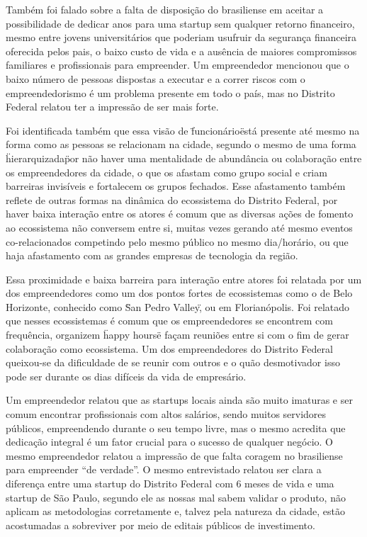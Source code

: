 Também foi falado sobre a falta de disposição do brasiliense em aceitar a possibilidade de dedicar anos para uma startup sem qualquer retorno financeiro, mesmo entre jovens universitários que poderiam usufruir da segurança financeira oferecida pelos pais, o baixo custo de vida e a ausência de maiores compromissos familiares e profissionais para empreender. Um empreendedor mencionou que o baixo número de pessoas dispostas a executar e a correr riscos com o empreendedorismo é um problema presente em todo o país, mas no Distrito Federal relatou ter a impressão de ser mais forte.

Foi identificada também que essa visão de \"funcionário\" está presente até mesmo na forma como as pessoas se relacionam na cidade, segundo o mesmo de uma forma \"hierarquizada\" por não haver uma mentalidade de abundância ou colaboração entre os empreendedores da cidade, o que os afastam como grupo social e criam barreiras invisíveis e fortalecem os grupos fechados. Esse afastamento também reflete de outras formas na dinâmica do ecossistema do Distrito Federal, por haver baixa interação entre os atores é comum que as diversas ações de fomento ao ecossistema não conversem entre si, muitas vezes gerando até mesmo eventos co-relacionados competindo pelo mesmo público no mesmo dia/horário, ou que haja afastamento com as grandes empresas de tecnologia da região.

Essa proximidade e baixa barreira para interação entre atores foi relatada por um dos empreendedores como um dos pontos fortes de ecossistemas como o de Belo Horizonte, conhecido como \"San Pedro Valley\", ou em Florianópolis. Foi relatado que nesses ecossistemas é comum que os empreendedores se encontrem com frequência, organizem \"happy hours\" e façam reuniões entre si com o fim de gerar colaboração como ecossistema. Um dos empreendedores do Distrito Federal queixou-se da dificuldade de se reunir com outros e o quão desmotivador isso pode ser durante os dias difíceis da vida de empresário.

Um empreendedor relatou que as startups locais ainda são muito imaturas e ser comum encontrar profissionais com altos salários, sendo muitos servidores públicos, empreendendo durante o seu tempo livre, mas o mesmo acredita que dedicação integral é um fator crucial para o sucesso de qualquer negócio. O mesmo empreendedor relatou a impressão de que falta coragem no brasiliense para empreender ``de verdade''. O mesmo entrevistado relatou ser clara a diferença entre uma startup do Distrito Federal com 6 meses de vida e uma startup de São Paulo, segundo ele as nossas mal sabem validar o produto, não aplicam as metodologias corretamente e, talvez pela natureza da cidade, estão acostumadas a sobreviver por meio de editais públicos de investimento.

